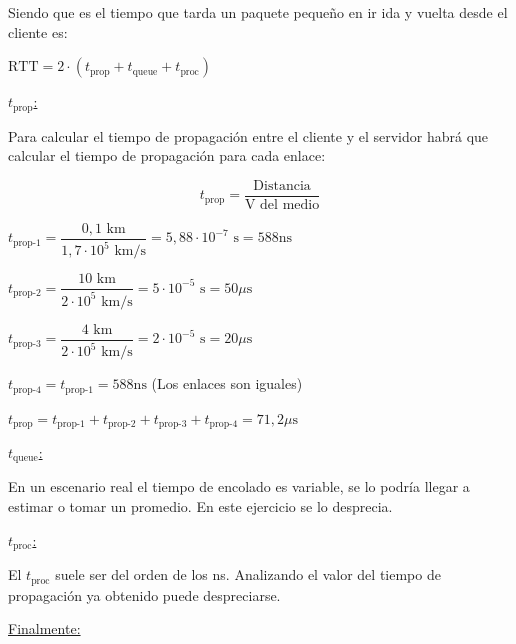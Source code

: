 Siendo que es el tiempo que tarda un paquete pequeño en ir ida y vuelta desde el cliente es:

\vspace{0.5\baselineskip}
\hfil
{\large
$\text{RTT} =
2 \cdot \left(t_{\text{prop}} + t_{\text{queue}} + t_{\text{proc}} \right)$
}
\hfil

{
\noindent\large
\underline{$t_{\text{prop}}$:}
}

\skipline
Para calcular el tiempo de propagación entre el cliente y el servidor habrá que calcular el tiempo de propagación para cada enlace:

$$t_{\text{prop}} = \dfrac{\text{Distancia}}{\text{V del medio}}$$

$t_{\text{prop-1}} =
\dfrac{0,1\text{ km}}{1,7\cdot 10^5\text{ km}/\text{s}} =
5,88 \cdot 10^{-7}\text{ s} = 588\text{ns}$

\vspace{0.5\baselineskip}
$t_{\text{prop-2}} =
\dfrac{10\text{ km}}{2\cdot 10^5\text{ km}/\text{s}} =
5 \cdot 10^{-5}\text{ s} = 50\mu\text{s}$

\vspace{0.5\baselineskip}
$t_{\text{prop-3}} =
\dfrac{4\text{ km}}{2\cdot 10^5\text{ km}/\text{s}} =
2 \cdot 10^{-5}\text{ s} = 20\mu\text{s}$

\vspace{0.5\baselineskip}
$t_{\text{prop-4}} = t_{\text{prop-1}} = 588\text{ns}$ (Los enlaces son iguales)

\vspace{\baselineskip}
$t_{\text{prop}} =
t_{\text{prop-1}} + t_{\text{prop-2}} + t_{\text{prop-3}}+ t_{\text{prop-4}} = 71,2 \mu\text{s}$


\skipline
{
\noindent\large
\underline{$t_{\text{queue}}$:}
}

\skipline
En un escenario real el tiempo de encolado es variable, se lo podría llegar a estimar o tomar un promedio. En este ejercicio se lo desprecia.


\skipline
{
\noindent\large
\underline{$t_{\text{proc}}$:}
}

\skipline
El $t_{\text{proc}}$ suele ser del orden de los ns. Analizando el valor del tiempo de propagación ya obtenido puede despreciarse.

\skipline
\noindent
\underline{Finalmente:}

{\large
\hfil
{}
\hfil
}


